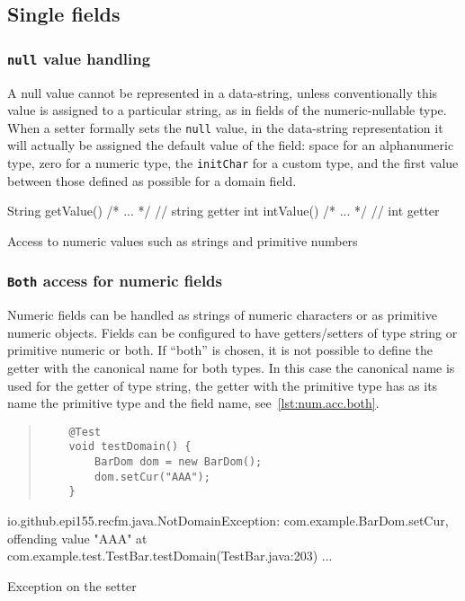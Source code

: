 \documentclass[a4paper,10pt]{report}
\newenvironment{elisting}[1][H]
  {\captionsetup{aboveskip=0pt}\begin{listing}[#1]}
  {\end{listing}%
}
\begin{document}
\subsection{Single fields}
\subsubsection*{\texttt{null} value handling}
A null value cannot be represented in a data-string, unless conventionally this 
value is assigned to a particular string, as in fields of the numeric-nullable 
type. 
When a setter formally sets the \texttt{null} value, in the data-string 
representation it will actually be assigned the default value of the field: 
space for an alphanumeric type, zero for a numeric type, the \texttt{initChar} 
for a custom type, and the first value between those defined as possible for a 
domain field.

\begin{elisting}[!htb]
\begin{javacode}
    String getValue() { /* ... */ }   // string getter
    int intValue() { /* ... */ }      // int getter
\end{javacode}
\caption{Access to numeric values such as strings and primitive numbers}
\label{lst:num.acc.both}
\end{elisting}

\subsubsection*{\texttt{Both} access for numeric fields}
Numeric fields can be handled as strings of numeric characters or as primitive 
numeric objects. Fields can be configured to have getters/setters of type string 
or primitive numeric or both. 
If ``both'' is chosen, it is not possible to define the getter with the 
canonical name for both types. 
In this case the canonical name is used for the getter of type string, 
the getter with the primitive type has as its name the primitive type and the 
field name, see~\ref{lst:num.acc.both}.

\begin{elisting}[!htb]
\begin{quote}
\begin{verbatim}
    @Test
    void testDomain() {
        BarDom dom = new BarDom();
        dom.setCur("AAA");
    }
\end{verbatim}
\end{quote}
\vspace*{-1cm}
\begin{javacode}
io.github.epi155.recfm.java.NotDomainException: com.example.BarDom.setCur, offending value "AAA"
	at com.example.test.TestBar.testDomain(TestBar.java:203)
	...
\end{javacode}
\caption{Exception on the setter}
\label{lst:set.throw}
\end{elisting}
\end{document}
